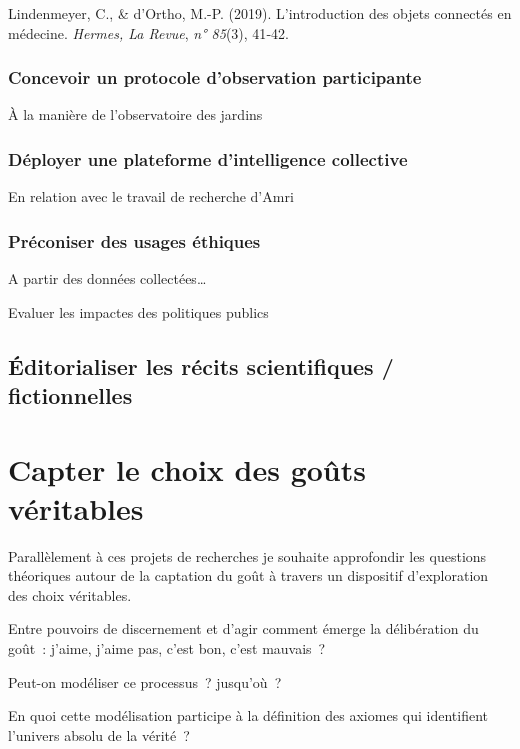 \documentclass[
  a4paper,
  DIV=11,
  numbers=noendperiod]{scrreprt}
\begin{document}
Lindenmeyer, C., \& d'Ortho, M.-P. (2019). L'introduction des objets
connectés en médecine. \emph{Hermes, La Revue}, \emph{n° 85}(3), 41‑42.

\subsection{Concevoir un protocole d'observation
participante}\label{concevoir-un-protocole-dobservation-participante}

À la manière de l'observatoire des jardins

\subsection{Déployer une plateforme d'intelligence
collective}\label{duxe9ployer-une-plateforme-dintelligence-collective}

En relation avec le travail de recherche d'Amri

\subsection{Préconiser des usages
éthiques}\label{pruxe9coniser-des-usages-uxe9thiques}

A partir des données collectées\ldots{}

Evaluer les impactes des politiques publics

\section{Éditorialiser les récits scientifiques /
fictionnelles}\label{uxe9ditorialiser-les-ruxe9cits-scientifiques-fictionnelles}

\chapter{Capter le choix des goûts véritables}\label{sec-capterGout}

Parallèlement à ces projets de recherches je souhaite approfondir les
questions théoriques autour de la captation du goût à travers un
dispositif d'exploration des choix véritables.

Entre pouvoirs de discernement et d'agir comment émerge la délibération
du goût~: j'aime, j'aime pas, c'est bon, c'est mauvais~?

Peut-on modéliser ce processus~? jusqu'où~?

En quoi cette modélisation participe à la définition des axiomes qui
identifient l'univers absolu de la vérité~?
\end{document}
